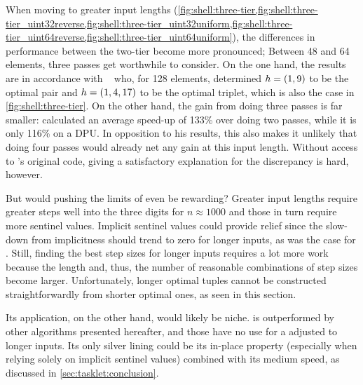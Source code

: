 When moving to greater input lengths (\cref{fig:shell:three-tier,fig:shell:three-tier_uint32reverse,fig:shell:three-tier_uint32uniform,fig:shell:three-tier_uint64reverse,fig:shell:three-tier_uint64uniform}), the differences in performance between the two-tier \ShS*{} become more pronounced;
Between 48 and 64 elements, three passes get worthwhile to consider.
On the one hand, the results are in accordance with \citeauthor{10.1007/3-540-44669-9_12}~\cite{10.1007/3-540-44669-9_12} who, for 128 elements, determined \(h = \lparen1, 9\rparen\) to be the optimal pair and \(h = \lparen1, 4, 17\rparen\) to be the optimal triplet, which is also the case in \cref{fig:shell:three-tier}.
On the other hand, the gain from doing three passes is far smaller:
 calculated an average speed-up of 133\% over doing two passes, while it is only 116\% on a DPU.
In opposition to his results, this also makes it unlikely that doing four passes would already net any gain at this input length.
Without access to \citeauthor{10.1007/3-540-44669-9_12}'s original code, giving a satisfactory explanation for the discrepancy is hard, however.

But would pushing the limits of \ShS{} even be rewarding?
Greater input lengths require greater steps \Dash well into the three digits for \(n \approx 1000\) \cite{skean2023optimization,10.1007/3-540-44669-9_12} \Dash and those in turn require more sentinel values.
Implicit sentinel values could provide relief since the slow-down from implicitness should trend to zero for longer inputs, as was the case for \IS{}.
Still, finding the best step sizes for longer inputs requires a lot more work because the length and, thus, the number of reasonable combinations of step sizes become larger.
Unfortunately, longer optimal tuples cannot be constructed straightforwardly from shorter optimal ones, as seen in this section.

Its application, on the other hand, would likely be niche.
\ShS{} is outperformed by other algorithms presented hereafter, and those have no use for a \ShS{} adjusted to longer inputs.
Its only silver lining could be its in-place property (especially when relying solely on implicit sentinel values) combined with its medium speed, as discussed in \cref{sec:tasklet:conclusion}.
